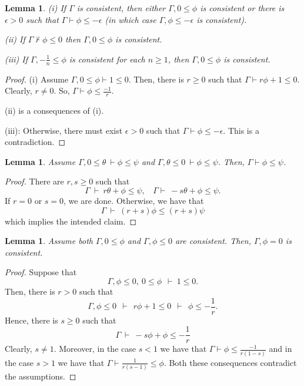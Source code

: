 \documentclass[12pt]{article}
\newtheorem{lemma}[theorem]{Lemma}
\begin{document}
\begin{lemma}\label{consequence2}
(i) If $\Gamma$ is consistent, then either $\Gamma,0\leqslant\phi$ is consistent or
there is $\epsilon>0$ such that $\Gamma\vdash\phi\leqslant-\epsilon$
(in which case $\Gamma,\phi\leqslant-\epsilon$ is consistent).

(ii) If $\Gamma\nvdash\phi\leqslant0$ then $\Gamma, 0\leqslant\phi$ is consistent.

(iii) If $\Gamma,-\frac{1}{n}\leqslant\phi$ is consistent for each $n\geqslant1$, then $\Gamma,0\leqslant\phi$ is consistent.
\end{lemma}
\begin{proof}
(i) Assume $\Gamma,0\leqslant\phi\vdash1\leqslant0$. Then, there is $r\geqslant0$ such that
$\Gamma\vdash r\phi+1\leqslant0$. Clearly, $r\neq0$. So, $\Gamma\vdash\phi\leqslant\frac{-1}{r}$.

(ii) is a consequences of (i).

(iii): Otherwise, there must exist $\epsilon>0$ such that $\Gamma\vdash\phi\leqslant-\epsilon$.
This is a contradiction.
\end{proof}

\begin{lemma}
Assume $\Gamma,0\leqslant\theta\ \vdash\phi\leqslant\psi$ and $\Gamma,\theta\leqslant0\ \vdash\phi\leqslant\psi$.
Then, $\Gamma\vdash\phi\leqslant\psi$.
\end{lemma}
\begin{proof}
There are $r,s\geqslant0$ such that
$$\Gamma\ \vdash\ r\theta+\phi\leqslant\psi,\ \ \ \ \Gamma \vdash\ -s\theta+\phi\leqslant\psi.$$
If $r=0$ or $s=0$, we are done. Otherwise, we have that
$$\Gamma\ \vdash\ (r+s)\phi\leqslant(r+s)\psi$$ which implies the intended claim.
\end{proof}

\begin{lemma}\label{mean-proof0}
Assume both $\Gamma,0\leqslant\phi$ and $\Gamma,\phi\leqslant0$ are consistent. Then, $\Gamma,\phi=0$ is consistent.
\end{lemma}
\begin{proof}
Suppose that $$\Gamma,\phi\leqslant0,\ 0\leqslant\phi\ \ \vdash\ 1\leqslant0.$$
Then, there is $r>0$ such that
$$\Gamma,\phi\leqslant0\ \ \vdash\ \ r\phi+1\leqslant0\ \ \vdash\ \ \phi\leqslant-\frac{1}{r}.$$
Hence, there is $s\geqslant0$ such that
$$\Gamma\ \vdash\ -s\phi+\phi\leqslant-\frac{1}{r}$$
Clearly, $s\neq1$. Moreover, in the case $s<1$ we have that $\Gamma\vdash\phi\leqslant\frac{-1}{r(1-s)}$
and in the case $s>1$ we have that $\Gamma\vdash\frac{1}{r(s-1)}\leqslant\phi$.
Both these consequences contradict the assumptions.
\end{proof}
\end{document}
